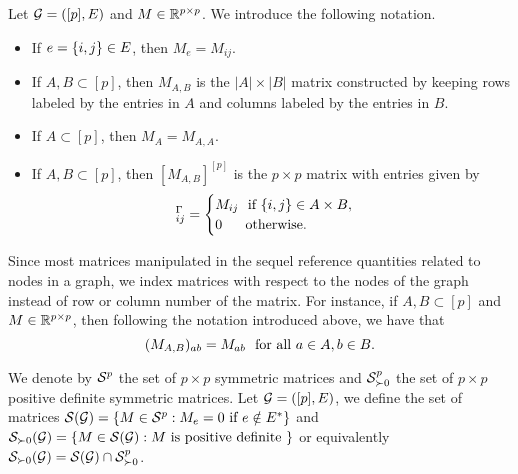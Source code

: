 Let $\G = ([p], E)$ and $M \in \R^{p \times p}$. We introduce the following notation.
\begin{itemize}
    \item If $e = \eset{i, j} \in E$, then $M_e = M_{ij}$.
    \item If $A, B \subset [p]$, then $M_{A, B}$ is the $|A| \times |B|$ matrix constructed by keeping rows labeled by the entries in $A$ and columns labeled by the entries in $B$.
    \item If $A \subset [p]$, then $M_A = M_{A, A}$.
    \item {
        If $A, B \subset [p]$, then $[M_{A, B}]^{[p]}$ is the $p \times p$ matrix with entries given by
        \begin{equation*}
            [M_{A, B}]^{\Gamma}_{ij} = \begin{cases}
                M_{ij} \ \t{ if } \eset{i, j} \in A \times B, \\
                0 \ \ \ \ \ \t{otherwise}.
            \end{cases}
        \end{equation*}
    }
\end{itemize}
Since most matrices manipulated in the sequel reference quantities related to nodes in a graph, we index matrices with respect to the nodes of the graph instead of row or column number of the matrix. For instance, if $A, B \subset [p]$ and $M \in \R^{p \times p}$, then following the notation introduced above, we have that
\begin{equation*}
    (M_{A, B})_{ab} = M_{ab} \ \ \t{for all } a \in A, b \in B.
\end{equation*}

We denote by $\S^p$ the set of $p \times p$ symmetric matrices and $\S^p_{\succ 0}$ the set of $p \times p$ positive definite symmetric matrices. Let $\G = ([p], E)$, we define the set of matrices $\S(\G) = \eset{ M \in \S^p : M_e = 0 \t{ if } e \notin E^* }$ and $\S_{\succ 0}(\G) = \eset{ M \in \S(\G) : M \t{ is positive definite } }$ or equivalently $\S_{\succ 0}(\G) = \S(\G) \cap \S^p_{\succ 0}$.